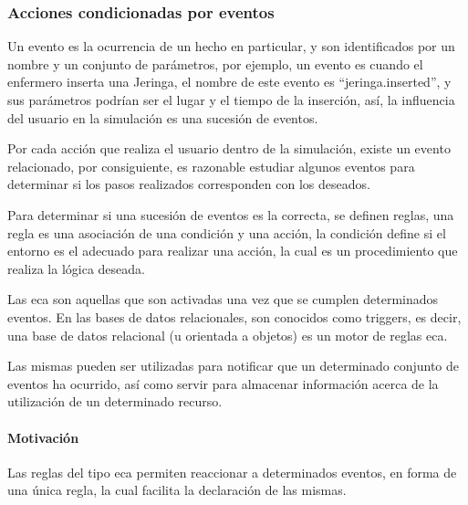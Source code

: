 \subsubsection{Acciones condicionadas por eventos}


Un evento es la ocurrencia de un hecho en particular, y son identificados por un
nombre y un conjunto de parámetros, por ejemplo, un evento es cuando el
enfermero inserta una Jeringa, el nombre de este evento es
\enquote{jeringa.inserted}, y sus parámetros podrían ser el lugar y el tiempo de
la inserción, así, la influencia del usuario en la simulación es una sucesión de
eventos.

Por cada acción que realiza el usuario dentro de la simulación, existe un evento
relacionado, por consiguiente, es razonable estudiar algunos eventos para
determinar si los pasos realizados corresponden con los deseados. 

Para determinar si una sucesión de eventos es la correcta, se definen reglas,
una regla es una asociación de una condición y una acción, la condición define
si el entorno es el adecuado para realizar una acción, la cual es un
procedimiento que realiza la lógica deseada.

Las \gls{eca} son aquellas que son activadas una vez que se cumplen determinados
eventos\cite{bailey2004event}. En las bases de datos relacionales, son conocidos
como triggers, es decir, una base de datos relacional (u orientada a objetos) es
un motor de reglas \gls{eca}\cite{bailey2004event,behrends2006combining}.

Las mismas pueden ser utilizadas para notificar que un determinado conjunto de
eventos ha ocurrido\cite{bailey2004event}, así como servir para almacenar
información acerca de la utilización de un determinado recurso.


\paragraph{Motivación}

Las reglas del tipo \gls{eca} permiten reaccionar a determinados eventos, en
forma de una única regla, la cual facilita la declaración de las
mismas\cite{bailey2004event}.

